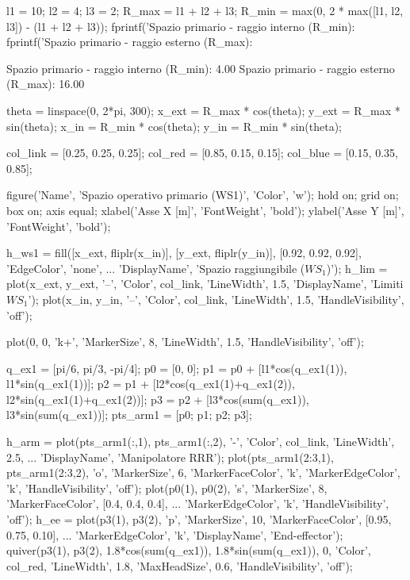\documentclass[11pt, a4paper]{article}
\begin{document}
\begin{matlabcode}
l1 = 10;
l2 = 4;
l3 = 2;
R_max = l1 + l2 + l3;
R_min = max(0, 2 * max([l1, l2, l3]) - (l1 + l2 + l3));
fprintf('Spazio primario - raggio interno (R_min): %
fprintf('Spazio primario - raggio esterno (R_max): %
\end{matlabcode}
\begin{matlaboutput}
Spazio primario - raggio interno (R_min): 4.00
Spazio primario - raggio esterno (R_max): 16.00
\end{matlaboutput}
\newpage
\begin{matlabcode}
theta = linspace(0, 2*pi, 300);
x_ext = R_max * cos(theta);  y_ext = R_max * sin(theta);
x_in  = R_min * cos(theta);  y_in  = R_min * sin(theta);

col_link = [0.25, 0.25, 0.25];
col_red  = [0.85, 0.15, 0.15];
col_blue = [0.15, 0.35, 0.85];

figure('Name', 'Spazio operativo primario (WS1)', 'Color', 'w');
hold on; grid on; box on; axis equal;
xlabel('Asse X [m]', 'FontWeight', 'bold');
ylabel('Asse Y [m]', 'FontWeight', 'bold');

h_ws1 = fill([x_ext, fliplr(x_in)], [y_ext, fliplr(y_in)], [0.92, 0.92, 0.92], 'EdgeColor', 'none', ...
    'DisplayName', 'Spazio raggiungibile ($WS_1$)');
h_lim = plot(x_ext, y_ext, '--', 'Color', col_link, 'LineWidth', 1.5, 'DisplayName', 'Limiti $WS_1$');
plot(x_in, y_in, '--', 'Color', col_link, 'LineWidth', 1.5, 'HandleVisibility', 'off');

plot(0, 0, 'k+', 'MarkerSize', 8, 'LineWidth', 1.5, 'HandleVisibility', 'off');

q_ex1 = [pi/6, pi/3, -pi/4];
p0 = [0, 0];
p1 = p0 + [l1*cos(q_ex1(1)), l1*sin(q_ex1(1))];
p2 = p1 + [l2*cos(q_ex1(1)+q_ex1(2)), l2*sin(q_ex1(1)+q_ex1(2))];
p3 = p2 + [l3*cos(sum(q_ex1)), l3*sin(sum(q_ex1))];
pts_arm1 = [p0; p1; p2; p3];

h_arm = plot(pts_arm1(:,1), pts_arm1(:,2), '-', 'Color', col_link, 'LineWidth', 2.5, ...
    'DisplayName', 'Manipolatore RRR');
plot(pts_arm1(2:3,1), pts_arm1(2:3,2), 'o', 'MarkerSize', 6, 'MarkerFaceColor', 'k', 'MarkerEdgeColor', 'k', 'HandleVisibility', 'off');
plot(p0(1), p0(2), 's', 'MarkerSize', 8, 'MarkerFaceColor', [0.4, 0.4, 0.4], ...
    'MarkerEdgeColor', 'k', 'HandleVisibility', 'off');
h_ee = plot(p3(1), p3(2), 'p', 'MarkerSize', 10, 'MarkerFaceColor', [0.95, 0.75, 0.10], ...
    'MarkerEdgeColor', 'k', 'DisplayName', 'End-effector');
quiver(p3(1), p3(2), 1.8*cos(sum(q_ex1)), 1.8*sin(sum(q_ex1)), 0, 'Color', col_red, 'LineWidth', 1.8, 'MaxHeadSize', 0.6, 'HandleVisibility', 'off');


\end{matlabcode}
\end{document}
